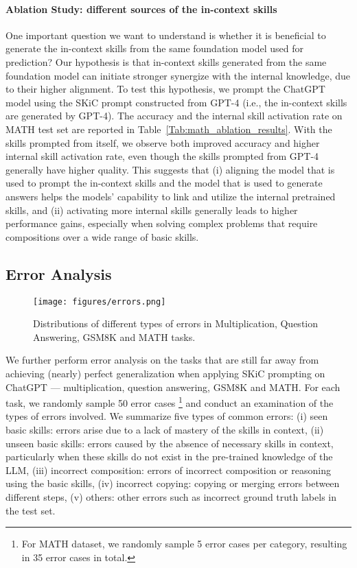 \documentclass{article} \usepackage{arxiv}
\begin{document}
\paragraph{Ablation Study: different sources of the in-context skills} One important question we want to understand is whether it is beneficial to generate the in-context skills from the same foundation model used for prediction? Our hypothesis is that in-context skills generated from the same foundation model can initiate stronger synergize with the internal knowledge, due to their higher alignment. To test this hypothesis, we prompt the ChatGPT model using the SKiC prompt constructed from GPT-4 (i.e., the in-context skills are generated by GPT-4). The accuracy and the internal skill activation rate on MATH test set are reported in Table~\ref{Tab:math_ablation_results}. With the skills prompted from itself, we observe both improved accuracy and higher internal skill activation rate, even though the skills prompted from GPT-4 generally have higher quality. This suggests that (i) aligning the model that is used to prompt the in-context skills and the model that is used to generate answers helps the models' capability to link and utilize the internal pretrained skills, and (ii) activating more internal skills generally leads to higher performance gains, especially when solving complex problems that require compositions over a wide range of basic skills.


 


\subsection{Error Analysis}


\begin{figure}[t]
    \centering
    \texttt{[image: figures/errors.png]}
    \caption{Distributions of different types of errors in Multiplication, Question Answering, GSM8K and MATH tasks.}
    \label{fig:errors}
\end{figure}



We further perform error analysis on the tasks that are still far away from achieving (nearly) perfect generalization when applying SKiC prompting on ChatGPT --- multiplication, question answering, GSM8K and MATH. For each task, we randomly sample 50 error cases \footnote{For MATH dataset, we randomly sample 5 error cases per category, resulting in 35 error cases in total.} \citep{zhou2022least} and conduct an examination of the types of errors involved. We summarize five types of common errors: (i) seen basic skills: errors arise due to a lack of mastery of the skills in context, (ii) unseen basic skills: errors caused by the absence of necessary skills in context, particularly when these skills do not exist in the pre-trained knowledge of the LLM, (iii) incorrect composition: errors of incorrect composition or reasoning using the basic skills, (iv) incorrect copying: copying or merging errors between different steps, (v) others: other errors such as incorrect ground truth labels in the test set. 
\end{document}
